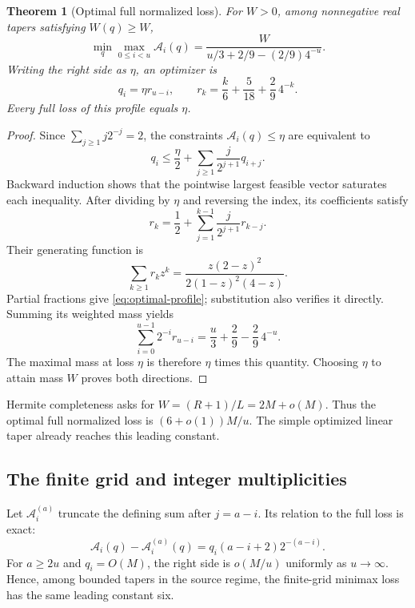 \documentclass[11pt,letterpaper]{article}
\numberwithin{equation}{section}
\newtheorem{theorem}{Theorem}[section]
\theoremstyle{definition}
\theoremstyle{remark}
\begin{document}
\begin{theorem}[Optimal full normalized loss]
\label{thm:optimal}
For $W>0$, among nonnegative real tapers satisfying $W(q)\ge W$,
\begin{equation}
 \min_q\max_{0\le i<u}\mathcal A_i(q)
   =\frac{W}{u/3+2/9-(2/9)4^{-u}}.
 \label{eq:optimal-value}
\end{equation}
Writing the right side as $\eta$, an optimizer is
\begin{equation}
 q_i=\eta r_{u-i},\qquad
 r_k=\frac{k}{6}+\frac5{18}+\frac29\,4^{-k}.
 \label{eq:optimal-profile}
\end{equation}
Every full loss of this profile equals $\eta$.
\end{theorem}
\begin{proof}
Since $\sum_{j\ge1}j2^{-j}=2$, the constraints
$\mathcal A_i(q)\le\eta$ are equivalent to
\[
 q_i\le\frac\eta2+\sum_{j\ge1}\frac{j}{2^{j+1}}q_{i+j}.
\]
Backward induction shows that the pointwise largest feasible vector
saturates each inequality. After dividing by $\eta$ and reversing the
index, its coefficients satisfy
\[
 r_k=\frac12+\sum_{j=1}^{k-1}\frac{j}{2^{j+1}}r_{k-j}.
\]
Their generating function is
\[
 \sum_{k\ge1}r_kz^k
   =\frac{z(2-z)^2}{2(1-z)^2(4-z)}.
\]
Partial fractions give \eqref{eq:optimal-profile}; substitution also
verifies it directly. Summing its weighted mass yields
\[
 \sum_{i=0}^{u-1}2^{-i}r_{u-i}
    =\frac u3+\frac29-\frac29\,4^{-u}.
\]
The maximal mass at loss $\eta$ is therefore $\eta$ times this quantity.
Choosing $\eta$ to attain mass $W$ proves both directions.
\end{proof}

Hermite completeness asks for $W=(R+1)/L=2M+o(M)$. Thus the optimal
full normalized loss is $(6+o(1))M/u$. The simple optimized linear taper
already reaches this leading constant.

\subsection{The finite grid and integer multiplicities}

Let $\mathcal A_i^{(a)}$ truncate the defining sum after $j=a-i$.
Its relation to the full loss is exact:
\begin{equation}
 \mathcal A_i(q)-\mathcal A_i^{(a)}(q)
    =q_i(a-i+2)2^{-(a-i)}.\label{eq:finite-tail}
\end{equation}
For $a\ge2u$ and $q_i=O(M)$, the right side is $o(M/u)$ uniformly as
$u\to\infty$. Hence, among bounded tapers in the source regime,
the finite-grid minimax loss has the same leading constant six.
\end{document}
